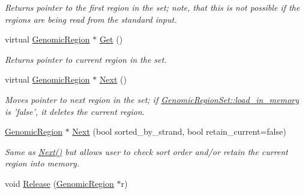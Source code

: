 \begin{CompactItemize}
\begin{CompactList}\small\item\em Returns pointer to the first region in the set; note, that this is not possible if the regions are being read from the standard input. \item\end{CompactList}\item 
\hypertarget{classGenomicRegionSet_77031066d2648c8935c291ef227b37be}{
virtual \hyperlink{classGenomicRegion}{GenomicRegion} $\ast$ \hyperlink{classGenomicRegionSet_77031066d2648c8935c291ef227b37be}{Get} ()}
\label{classGenomicRegionSet_77031066d2648c8935c291ef227b37be}

\begin{CompactList}\small\item\em Returns pointer to current region in the set. \item\end{CompactList}\item 
\hypertarget{classGenomicRegionSet_4f7501a27d13cae65247686182b78d51}{
virtual \hyperlink{classGenomicRegion}{GenomicRegion} $\ast$ \hyperlink{classGenomicRegionSet_4f7501a27d13cae65247686182b78d51}{Next} ()}
\label{classGenomicRegionSet_4f7501a27d13cae65247686182b78d51}

\begin{CompactList}\small\item\em Moves pointer to next region in the set; if \hyperlink{classGenomicRegionSet_de43c6cd72b95da75395129b00a52687}{GenomicRegionSet::load\_\-in\_\-memory} is 'false', it deletes the current region. \item\end{CompactList}\item 
\hyperlink{classGenomicRegion}{GenomicRegion} $\ast$ \hyperlink{classGenomicRegionSet_c11134b4ccc2ad002ef20ac12d3b70b8}{Next} (bool sorted\_\-by\_\-strand, bool retain\_\-current=false)
\begin{CompactList}\small\item\em Same as \hyperlink{classGenomicRegionSet_4f7501a27d13cae65247686182b78d51}{Next()} but allows user to check sort order and/or retain the current region into memory. \item\end{CompactList}\item 
\hypertarget{classGenomicRegionSet_8993c741ef2513ba5c5b88eb390f1f99}{
void \hyperlink{classGenomicRegionSet_8993c741ef2513ba5c5b88eb390f1f99}{Release} (\hyperlink{classGenomicRegion}{GenomicRegion} $\ast$r)}
\label{classGenomicRegionSet_8993c741ef2513ba5c5b88eb390f1f99}


\end{CompactItemize}
